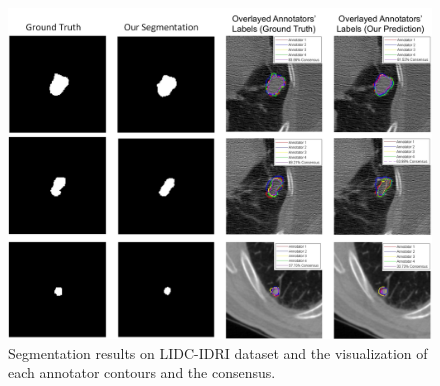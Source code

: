 \begin{figure}[h]  
        \center
        \includegraphics[scale=0.21]{chapter_8/picture7.jpg}
        \caption{Segmentation results on LIDC-IDRI dataset and the visualization of each annotator contours and the consensus.}
        \label{LIDCresults}
\end{figure}


